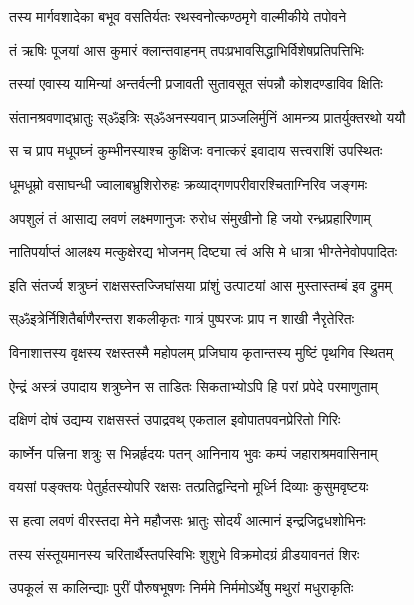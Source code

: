 \twolineshloka
{तस्य मार्गवशादेका बभूव वसतिर्यतः}
{रथस्वनोत्कण्ठमृगे वाल्मीकीये तपोवने}%

\twolineshloka
{तं ऋषिः पूजयां आस कुमारं क्लान्तवाहनम्}
{तपःप्रभावसिद्धाभिर्विशेषप्रतिपत्तिभिः}%

\twolineshloka
{तस्यां एवास्य यामिन्यां अन्तर्वत्नी प्रजावती}
{सुतावसूत संपन्नौ कोशदण्डाविव क्षितिः}%

\twolineshloka
{संतानश्रवणाद्भ्रातुः स्ॐइत्रिः स्ॐअनस्यवान्}
{प्राञ्जलिर्मुनिं आमन्त्र्य प्रातर्युक्तरथो ययौ}%

\twolineshloka
{स च प्राप मधूपघ्नं कुम्भीनस्याश्च कुक्षिजः}
{वनात्करं इवादाय सत्त्वराशिं उपस्थितः}%

\twolineshloka
{धूमधूम्रो वसाघन्धी ज्वालाबभ्रुशिरोरुहः}
{क्रव्याद्गणपरीवारश्चिताग्निरिव जङ्गमः}%

\twolineshloka
{अपशुलं तं आसाद्य लवणं लक्ष्मणानुजः}
{रुरोध संमुखीनो हि जयो रन्ध्रप्रहारिणाम्}%

\twolineshloka
{नातिपर्याप्तं आलक्ष्य मत्कुक्षेरद्य भोजनम्}
{दिष्ट्या त्वं असि मे धात्रा भीग्तेनेवोपपादितः}%

\twolineshloka
{इति संतर्ज्य शत्रुघ्नं राक्षसस्तज्जिघांसया}
{प्रांशुं उत्पाटयां आस मुस्तास्तम्बं इव द्रुमम्}%

\twolineshloka
{स्ॐइत्रेर्निशितैर्बाणैरन्तरा शकलीकृतः}
{गात्रं पुष्परजः प्राप न शाखी नैरृतेरितः}%

\twolineshloka
{विनाशात्तस्य वृक्षस्य रक्षस्तस्मै महोपलम्}
{प्रजिघाय कृतान्तस्य मुष्टिं पृथगिव स्थितम्}%

\twolineshloka
{ऐन्द्रं अस्त्रं उपादाय शत्रुघ्नेन स ताडितः}
{सिकताभ्योऽपि हि परां प्रपेदे परमाणुताम्}%

\twolineshloka
{दक्षिणं दोषं उद्यम्य राक्षसस्तं उपाद्रवथ्}
{एकताल इवोपातपवनप्रेरितो गिरिः}%

\twolineshloka
{कार्ष्नेन पत्त्रिना शत्रुः स भिन्नर्हृदयः पतन्}
{आनिनाय भुवः कम्पं जहाराश्रमवासिनाम्}%

\twolineshloka
{वयसां पङ्क्तयः पेतुर्हतस्योपरि रक्षसः}
{तत्प्रतिद्वन्दिनो मूर्ध्नि दिव्याः कुसुमवृष्टयः}%

\twolineshloka
{स हत्वा लवणं वीरस्तदा मेने महौजसः}
{भ्रातुः सोदर्यं आत्मानं इन्द्रजिद्वधशोभिनः}%

\twolineshloka
{तस्य संस्तूयमानस्य चरितार्थैस्तपस्विभिः}
{शुशुभे विक्रमोदग्रं व्रीडयावनतं शिरः}%

\twolineshloka
{उपकूलं स कालिन्द्याः पुरीं पौरुषभूषणः}
{निर्ममे निर्ममोऽर्थेषु मथुरां मधुराकृतिः}%

